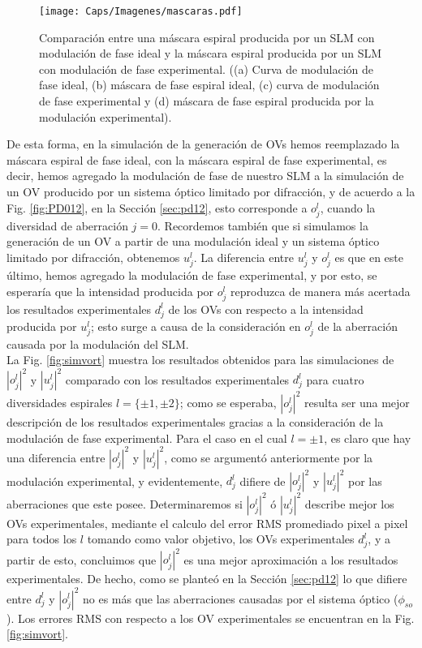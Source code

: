 \begin{figure}[!ht]
  \centering
    \texttt{[image: Caps/Imagenes/mascaras.pdf]}
  \caption[Comparación entre una máscara espiral ideal y experimental.]{Comparación entre una máscara espiral producida por un SLM con modulación de fase ideal y la máscara espiral producida por un SLM con modulación de fase experimental. ((a) Curva de modulación de fase ideal, (b) máscara de fase espiral ideal, (c) curva de modulación de fase experimental y (d) máscara de fase espiral producida por la modulación experimental).}
  \label{fig:mascaras}
\end{figure}

De esta forma, en la simulación de la generación de OVs hemos reemplazado la máscara espiral de fase ideal, con la máscara espiral de fase experimental, es decir, hemos agregado la modulación de fase de nuestro SLM a la simulación de un OV producido por un sistema óptico limitado por difracción, y de acuerdo a la Fig. \ref{fig:PD012}, en la Sección \ref{sec:pd12}, esto corresponde a $o_j^l$, cuando la diversidad de aberración $j=0$. Recordemos también que si simulamos la generación de un OV a partir de una modulación ideal y un sistema óptico limitado por difracción, obtenemos $u_j^l$. La diferencia entre $u_j^l$ y $o_j^l$ es que en este último, hemos agregado la modulación de fase experimental, y por esto, se esperaría que la intensidad producida por $o_j^l$ reproduzca de manera más acertada los resultados experimentales $d_j^l$ de los OVs con respecto a la intensidad producida por $u_j^l$; esto surge a causa de la consideración en $o_j^l$ de la aberración causada por la modulación del SLM.\\

La Fig. \ref{fig:simvort} muestra los resultados obtenidos para las simulaciones de $|o_j^l|^2$ y $|u_j^l|^2$ comparado con los resultados experimentales $d_j^l$ para cuatro diversidades espirales $l = \{\pm 1, \pm 2\}$; como se esperaba, $|o_j^l|^2$ resulta ser una mejor descripción de los resultados experimentales gracias a la consideración de la modulación de fase experimental. Para el caso en el cual $l=\pm 1$, es claro que hay una diferencia entre $|o_j^l|^2$ y $|u_j^l|^2$, como se argumentó anteriormente por la modulación experimental, y evidentemente, $d_j^l$ difiere de $|o_j^l|^2$ y $|u_j^l|^2$ por las aberraciones que este posee. Determinaremos si $|o_j^l|^2$ ó $|u_j^l|^2$ describe mejor los OVs experimentales, mediante el calculo del error RMS promediado pixel a pixel para todos los $l$ tomando como valor objetivo, los OVs experimentales $d_j^l$, y a partir de esto, concluimos que $|o_j^l|^2$ es una mejor aproximación a los resultados experimentales. De hecho, como se planteó en la Sección \ref{sec:pd12} lo que difiere entre $d_j^l$ y $|o_j^l|^2$ no es más que las aberraciones causadas por el sistema óptico ($\phi_{so}$). Los errores RMS con respecto a los OV experimentales se encuentran en la Fig. \ref{fig:simvort}.\\

